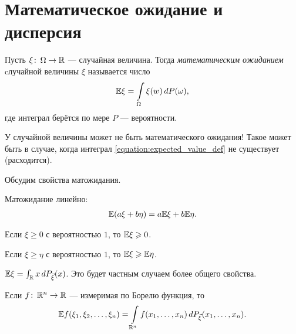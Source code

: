 \documentclass[../main.tex]{subfiles}
\begin{document}
\newpage
\section{Математическое ожидание и дисперсия}
\begin{df}
 Пусть $ \xi \colon \, \Omega \to \mathbb{R}$ --- случайная величина. Тогда \textit{математическим ожиданием} cлучайной величины $ \xi $ называется число
 \begin{align}
  \label{equation:expected_value_def}
  \mathbb E \xi = \int\limits_{\Omega}  \xi(w)\,dP(\omega),
 \end{align} где интеграл берётся по мере $ P $ --- вероятности.
\end{df}
\begin{remrk*}
 У случайной величины может не быть математического ожидания! Такое может быть в случае, когда интеграл \eqref{equation:expected_value_def} не существует (расходится).
\end{remrk*}
Обсудим свойства матожидания.
\begin{prop}
 Матожидание линейно:
 \begin{align*}
  \mathbb E(a\xi + b\eta) = a \mathbb E \xi + b \mathbb E \eta.
 \end{align*} 
\end{prop}
\begin{prop}
 Если $ \xi \geqslant 0 $ с вероятностью $ 1 $, то $ \mathbb E \xi \geqslant 0 $.
\end{prop}
\begin{prop}
 Если $ \xi \geqslant \eta $ с вероятностью $ 1 $, то $ \mathbb E\xi \geqslant \mathbb E\eta $.
\end{prop}
\begin{prop}
$ \mathbb E\xi = \int_{\mathbb{R}} x\,dP_{\vec \xi}(x)  $.
 Это будет частным случаем более общего свойства.
\end{prop}
\begin{prop}
 Если $ f \colon\, \mathbb{R}^{n}\to\mathbb{R} $ --- измеримая по Борелю функция, то
 \begin{align*}
  \mathbb E f(\xi_1, \xi_2, \ldots, \xi_n) = \int\limits_{\mathbb{R}^{n}} f(x_1, \ldots, x_n) \,d P_{\vec\xi}(x_1, \ldots, x_n).
 \end{align*} 
\end{prop}
\end{document}
